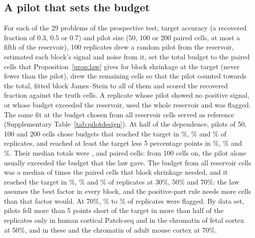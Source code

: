 \subsection*{A pilot that sets the budget}
For each of the 29 problems of the prospective test, target accuracy (a recovered fraction of 0.3, 0.5 or 0.7) and pilot size (50, 100 or 200 paired cells, at most a fifth of the reservoir), 100 replicates drew a random pilot from the reservoir, estimated each block's signal and noise from it, set the total budget to the paired cells that Proposition~\ref{prop:law} gives for block shrinkage at the target (never fewer than the pilot), drew the remaining cells so that the pilot counted towards the total, fitted block James--Stein to all of them and scored the recovered fraction against the truth cells. A replicate whose pilot showed no positive signal, or whose budget exceeded the reservoir, used the whole reservoir and was flagged. The same fit at the budget chosen from all reservoir cells served as reference (Supplementary Table~\ref{tab:pilotdesign}). At half of the dependence, pilots of 50, 100 and 200 cells chose budgets that reached the target in \RvPilotHalfFiftyReached\%, \RvPilotHalfHundredReached\% and \RvPilotHalfTwoHundredReached\% of replicates, and reached at least the target less 5 percentage points in \RvPilotHalfFiftyWithin\%, \RvPilotHalfHundredWithin\% and \RvPilotHalfTwoHundredWithin\%. Their median totals were \RvPilotHalfFiftyBudget, \RvPilotHalfHundredBudget{} and \RvPilotHalfTwoHundredBudget{} paired cells: from 100 cells on, the pilot alone usually exceeded the budget that the law gave. The budget from all reservoir cells was a median of \RvPilotHalfResRatio{} times the paired cells that block shrinkage needed, and it reached the target in \RvPilotThreeResReached\%, \RvPilotHalfResReached\% and \RvPilotSevenResReached\% of replicates at 30\%, 50\% and 70\%: the law assumes the best factor in every block, and the positive-part rule needs more cells than that factor would. At 70\%, \RvPilotSevenFiftyFlagged\% to \RvPilotSevenTwoHundredFlagged\% of replicates were flagged. By data set, pilots fell more than 5 points short of the target in more than half of the replicates only in human cortical Patch-seq and in the chromatin of fetal cortex at 50\%, and in these and the chromatin of adult mouse cortex at 70\%.

